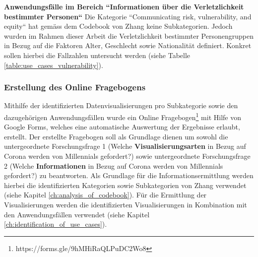 \noindent
\textbf{Anwendungsfälle im Bereich ``Informationen über die Verletzlichkeit bestimmter Personen``}
\newline
\indent
Die Kategorie ``Communicating risk, vulnerability, and equity`` hat gemäss dem Codebook von Zhang keine Subkategorien. Jedoch wurden im Rahmen dieser Arbeit die Verletzlichkeit bestimmter Personengruppen in Bezug auf die Faktoren Alter, Geschlecht sowie Nationalität definiert. Konkret sollen hierbei die Fallzahlen untersucht werden (siehe Tabelle \ref{table:use_cases_vulnerability}).

\begin{table}[h]
\centering
{}
\caption{Zuordnung der Anwendungsfälle für die Kategorie ``Informationen über die Verletzlichkeit bestimmter Personen`` (Eigene Darstellung)}
\label{table:use_cases_vulnerability}
\end{table}

\subsubsection{Erstellung des Online Fragebogens}
Mithilfe der identifizierten Datenvisualisierungen pro Subkategorie sowie den dazugehörigen Anwendungsfällen wurde ein Online Fragebogen\footnote{https://forms.gle/9hMHiRaQLPuDC2Wo8} mit Hilfe von Google Forms, welches eine automatische Auswertung der Ergebnisse erlaubt, erstellt. Der erstellte Fragebogen soll als Grundlage dienen um sowohl die untergeordnete Forschungsfrage 1 (Welche \textbf{Visualisierungsarten} in Bezug auf Corona werden von Millennials gefordert?) sowie untergeordnete Forschungsfrage 2 (Welche \textbf{Informationen} in Bezug auf Corona werden von Millennials gefordert?) zu beantworten. Als Grundlage für die Informationsermittlung werden hierbei die identifizierten Kategorien sowie Subkategorien von Zhang verwendet (siehe Kapitel \ref{ch:analysis_of_codebook}). Für die Ermittlung der Visualisierungen werden die identifizierten Visualisierungen in Kombination mit den Anwendungsfällen verwendet (siehe Kapitel \ref{ch:identification_of_use_cases}).\\


